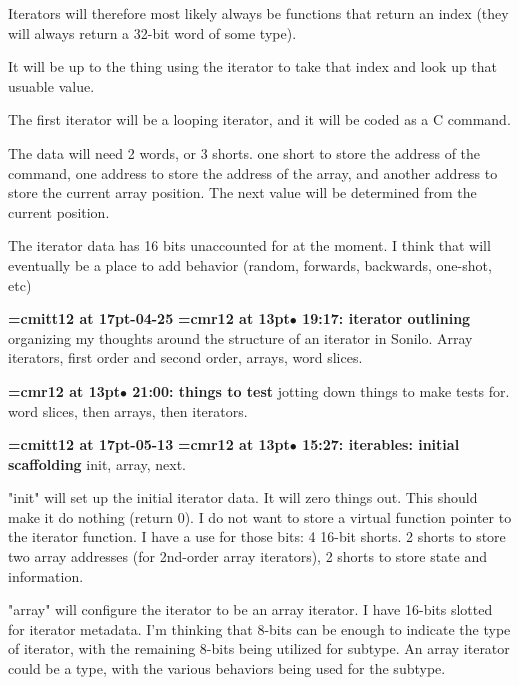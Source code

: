 Iterators will therefore most likely always be functions that return an index (they will always return a 32-bit word of some type).
\par

It will be up to the thing using the iterator to take that index and look up that usuable value.
\par

The first iterator will be a looping iterator, and it will be coded as a C command.
\par

The data will need 2 words, or 3 shorts. one short to store the address of the command, one address to store the address of the array, and another address to store the current array position. The next value will be determined from the current position.
\par

The iterator data has 16 bits unaccounted for at the moment. I think that will eventually be a place to add behavior  (random, forwards, backwards, one-shot, etc)
\par

{\medskip\noindent\bf\font\titlefont=cmitt12 at 17pt-04-25}\medskip
{\smallskip\noindent\bf\font\titlefont=cmr12 at 13pt\titlefont $\bullet$ 19:17: iterator outlining}\smallskip
organizing my thoughts around the structure of an iterator in Sonilo. Array iterators, first order and second order, arrays, word slices.
\par

{\smallskip\noindent\bf\font\titlefont=cmr12 at 13pt\titlefont $\bullet$ 21:00: things to test}\smallskip
jotting down things to make tests for. word slices, then arrays, then iterators.
\par

{\medskip\noindent\bf\font\titlefont=cmitt12 at 17pt-05-13}\medskip
{\smallskip\noindent\bf\font\titlefont=cmr12 at 13pt\titlefont $\bullet$ 15:27: iterables: initial scaffolding}\smallskip
init, array, next.
\par

"init" will set up the initial iterator data. It will zero things out. This should make it do nothing (return 0). I do not want to store a virtual function pointer to the iterator function. I have a use for those bits: 4 16-bit shorts. 2 shorts to store two array addresses (for 2nd-order array iterators), 2 shorts to store state and information.
\par

"array" will configure the iterator to be an array iterator. I have 16-bits slotted for iterator metadata. I'm thinking that 8-bits can be enough to indicate the type of iterator, with the remaining 8-bits being utilized for subtype. An array iterator could be a type, with the various behaviors being used for the subtype.
\par

